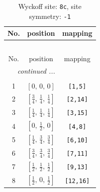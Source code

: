 \documentclass[fleqn,8pt]{jsarticle}
\begin{document}
\renewcommand{\arraystretch}{1.2}
\begin{longtable}{ccc}
\caption{Wyckoff site: {\tt 8c}, site symmetry: {\tt -1}}
 \\
 \hline \hline
No. & position & mapping \\ \hline \endfirsthead

\multicolumn{2}{l}{\tablename\ \thetable{}} \\
 \hline \hline
No. & position & mapping \\ \hline \endhead

 \hline \hline
\multicolumn{2}{r}{\footnotesize\it continued ...} \\ \endfoot

 \hline \hline
\multicolumn{2}{r}{} \\ \endlastfoot

1 & $\left[ 0,\, 0,\, 0 \right]$ & {\tt [1,5]} \\ \hline
2 & $\left[ \frac{3}{4},\, \frac{1}{4},\, \frac{1}{4} \right]$ & {\tt [2,14]} \\ \hline
3 & $\left[ \frac{1}{4},\, \frac{1}{4},\, \frac{1}{4} \right]$ & {\tt [3,15]} \\ \hline
4 & $\left[ 0,\, \frac{1}{2},\, 0 \right]$ & {\tt [4,8]} \\ \hline
5 & $\left[ \frac{1}{4},\, \frac{3}{4},\, \frac{3}{4} \right]$ & {\tt [6,10]} \\ \hline
6 & $\left[ \frac{3}{4},\, \frac{3}{4},\, \frac{3}{4} \right]$ & {\tt [7,11]} \\ \hline
7 & $\left[ \frac{1}{2},\, \frac{1}{2},\, \frac{1}{2} \right]$ & {\tt [9,13]} \\ \hline
8 & $\left[ \frac{1}{2},\, 0,\, \frac{1}{2} \right]$ & {\tt [12,16]} \\
\end{longtable}
\renewcommand{\arraystretch}{1.2}
\end{document}
